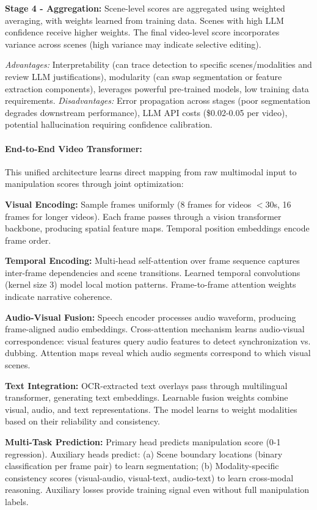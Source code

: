 \documentclass[runningheads]{llncs}
\begin{document}
\textbf{Stage 4 - Aggregation:} Scene-level scores are aggregated using weighted averaging, with weights learned from training data. Scenes with high LLM confidence receive higher weights. The final video-level score incorporates variance across scenes (high variance may indicate selective editing).

\textit{Advantages:} Interpretability (can trace detection to specific scenes/modalities and review LLM justifications), modularity (can swap segmentation or feature extraction components), leverages powerful pre-trained models, low training data requirements. \textit{Disadvantages:} Error propagation across stages (poor segmentation degrades downstream performance), LLM API costs (\$0.02-0.05 per video), potential hallucination requiring confidence calibration.

\paragraph{End-to-End Video Transformer:}

This unified architecture learns direct mapping from raw multimodal input to manipulation scores through joint optimization:

\textbf{Visual Encoding:} Sample frames uniformly (8 frames for videos $<$30s, 16 frames for longer videos). Each frame passes through a vision transformer backbone, producing spatial feature maps. Temporal position embeddings encode frame order.

\textbf{Temporal Encoding:} Multi-head self-attention over frame sequence captures inter-frame dependencies and scene transitions. Learned temporal convolutions (kernel size 3) model local motion patterns. Frame-to-frame attention weights indicate narrative coherence.

\textbf{Audio-Visual Fusion:} Speech encoder processes audio waveform, producing frame-aligned audio embeddings. Cross-attention mechanism learns audio-visual correspondence: visual features query audio features to detect synchronization vs. dubbing. Attention maps reveal which audio segments correspond to which visual scenes.

\textbf{Text Integration:} OCR-extracted text overlays pass through multilingual transformer, generating text embeddings. Learnable fusion weights combine visual, audio, and text representations. The model learns to weight modalities based on their reliability and consistency.

\textbf{Multi-Task Prediction:} Primary head predicts manipulation score (0-1 regression). Auxiliary heads predict: (a) Scene boundary locations (binary classification per frame pair) to learn segmentation; (b) Modality-specific consistency scores (visual-audio, visual-text, audio-text) to learn cross-modal reasoning. Auxiliary losses provide training signal even without full manipulation labels.
\end{document}
